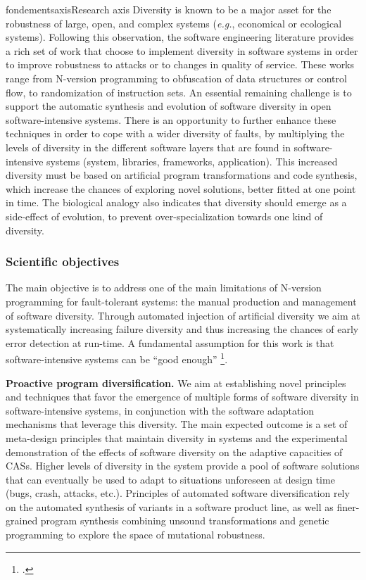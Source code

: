 \documentclass{ra2018}
\begin{document}
\begin{module}{fondements}{axis}{Research axis}
Diversity is known to be a major asset for the robustness of large, open, and complex systems (\textit{e.g.}, economical or ecological systems). 
Following this observation, the software engineering literature provides a rich set of work that choose to implement diversity in software systems in order to improve robustness to attacks or to changes in quality of service. 
These works range from N-version programming to obfuscation of data structures or control flow, to randomization of instruction sets. 
An essential remaining challenge is to support the automatic synthesis and evolution of software diversity in open software-intensive systems.
There is an opportunity to further enhance these techniques in order to cope with a wider diversity of faults, by multiplying the levels of diversity in the different software layers that are found in software-intensive systems (system, libraries, frameworks, application). 
This increased diversity must be based on artificial program transformations and code synthesis, which increase the chances of exploring novel solutions, better fitted at one point in time. The biological analogy also indicates that diversity should emerge as a side-effect of evolution, to prevent over-specialization towards one kind of diversity.


\subsubsection*{Scientific objectives} 

The main objective is to address one of the main limitations of N-version programming for fault-tolerant systems: the manual production and management of software diversity. Through automated injection of artificial diversity we aim at systematically increasing failure diversity and thus increasing the chances of early error detection at run-time. A fundamental assumption for this work is that software-intensive systems can be ``good enough''   \footcite{Rinard12, Zhu12}. 

\textbf{Proactive program diversification.} We aim at establishing novel principles and techniques that favor the emergence of multiple forms of software diversity in software-intensive systems, in conjunction with the software adaptation mechanisms that leverage this diversity. The main expected outcome is a set of meta-design principles that maintain diversity in systems and the experimental demonstration of the effects of software diversity on the
adaptive capacities of CASs. Higher levels of diversity in the system provide a pool of software solutions that can eventually be used to adapt to  situations unforeseen at design time (bugs, crash, attacks, etc.). Principles of automated software diversification rely on the automated synthesis of variants in a software product line, as well as finer-grained program synthesis combining unsound transformations and genetic programming to explore the space of mutational robustness.


\end{module}
\end{document}

